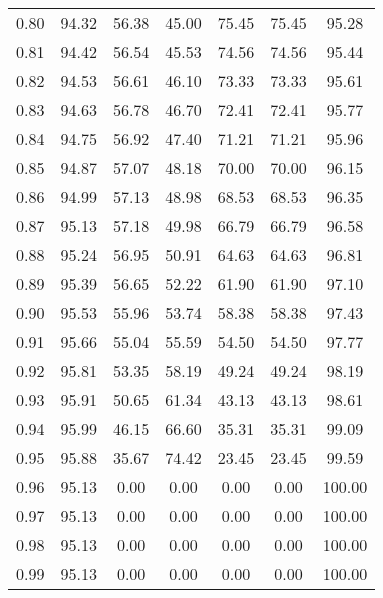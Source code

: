\begin{tabular}{|c|c|c|c|c|c|c|}
      0.80 &     94.32 &     56.38 &      45.00 &   75.45 &      75.45 &         95.28 \\
      0.81 &     94.42 &     56.54 &      45.53 &   74.56 &      74.56 &         95.44 \\
      0.82 &     94.53 &     56.61 &      46.10 &   73.33 &      73.33 &         95.61 \\
      0.83 &     94.63 &     56.78 &      46.70 &   72.41 &      72.41 &         95.77 \\
      0.84 &     94.75 &     56.92 &      47.40 &   71.21 &      71.21 &         95.96 \\
      0.85 &     94.87 &     57.07 &      48.18 &   70.00 &      70.00 &         96.15 \\
      0.86 &     94.99 &     57.13 &      48.98 &   68.53 &      68.53 &         96.35 \\
      0.87 &     95.13 &     57.18 &      49.98 &   66.79 &      66.79 &         96.58 \\
      0.88 &     95.24 &     56.95 &      50.91 &   64.63 &      64.63 &         96.81 \\
      0.89 &     95.39 &     56.65 &      52.22 &   61.90 &      61.90 &         97.10 \\
      0.90 &     95.53 &     55.96 &      53.74 &   58.38 &      58.38 &         97.43 \\
      0.91 &     95.66 &     55.04 &      55.59 &   54.50 &      54.50 &         97.77 \\
      0.92 &     95.81 &     53.35 &      58.19 &   49.24 &      49.24 &         98.19 \\
      0.93 &     95.91 &     50.65 &      61.34 &   43.13 &      43.13 &         98.61 \\
      0.94 &     95.99 &     46.15 &      66.60 &   35.31 &      35.31 &         99.09 \\
      0.95 &     95.88 &     35.67 &      74.42 &   23.45 &      23.45 &         99.59 \\
      0.96 &     95.13 &      0.00 &       0.00 &    0.00 &       0.00 &        100.00 \\
      0.97 &     95.13 &      0.00 &       0.00 &    0.00 &       0.00 &        100.00 \\
      0.98 &     95.13 &      0.00 &       0.00 &    0.00 &       0.00 &        100.00 \\
      0.99 &     95.13 &      0.00 &       0.00 &    0.00 &       0.00 &        100.00 \\
\bottomrule
\end{tabular}

